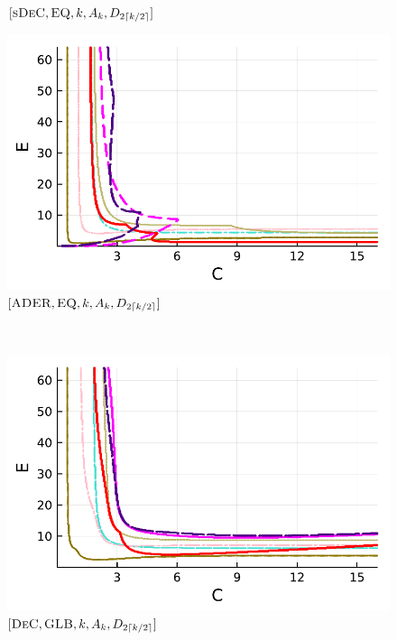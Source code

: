 \begin{figure}[!h]
\begin{minipage}[t]{0.32\textwidth}
		\centering
		$[\textsc{sDeC},\textsc{EQ}, k, A_k,D_{2\lceil k/2 \rceil}]$
	\end{minipage}
	\begin{minipage}[t]{0.32\textwidth}
		\includegraphics[width=\textwidth]{pdf/pdepics/diff/IMEXADER_equispaced_all_2-8.pdf}
		\centering
		$[\textsc{ADER},\textsc{EQ}, k, A_k,D_{2\lceil k/2 \rceil}]$
	\end{minipage}\\
	\begin{minipage}[t]{0.32\textwidth}
		\includegraphics[width=\textwidth]{pdf/pdepics/diff/IMEXDeC_gaussLobatto_all_2-8.pdf}
		\centering
		$[\textsc{DeC},\textsc{GLB}, k, A_k,D_{2\lceil k/2 \rceil}]$
	\end{minipage} 
	\begin{minipage}[t]{0.32\textwidth}

\end{minipage}
\end{figure}
